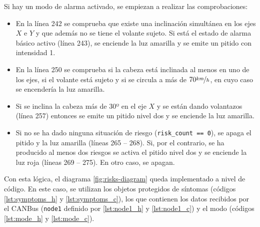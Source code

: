 Si hay un modo de alarma activado, se empiezan a realizar las comprobaciones:
\begin{itemize}
  \item En la línea 242 se comprueba que existe una inclinación simultánea en los ejes $X$
        e $Y$ y que además no se tiene el volante sujeto. Si está el estado de alarma
        básico activo (línea 243), se enciende la luz amarilla y se emite un pitido con
        intensidad 1.
  \item En la línea 250 se comprueba si la cabeza está inclinada al menos en uno de los ejes,
        si el volante está sujeto y si se circula a más de $70 \nicefrac{km}{h}$, en cuyo
        caso se encendería la luz amarilla.
  \item Si se inclina la cabeza más de 30º en el eje $X$ y se están dando volantazos (línea
        257) entonces se emite un pitido nivel dos y se enciende la luz amarilla.
  \item Si no se ha dado ninguna situación de riesgo (\texttt{risk\_count == 0}), se
        apaga el pitido y la luz amarilla (líneas 265 -- 268). Si, por el contrario, se
        ha producido al menos dos riesgos se activa el pitido nivel dos y se enciende
        la luz roja (líneas 269 -- 275). En otro caso, se apagan.
\end{itemize}

Con esta lógica, el diagrama \ref{fig:risks-diagram} queda implementado a nivel de código.
En este caso, se utilizan los objetos protegidos de síntomas (códigos \ref{lst:symptoms_h}
y \ref{lst:symptoms_c}), los que contienen los datos recibidos por el CANBus (\texttt{node1}
definido por \ref{lst:node1_h} y \ref{lst:node1_c}) y el modo (códigos \ref{lst:mode_h} y
\ref{lst:mode_c}).
